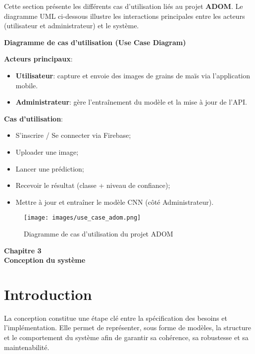 \documentclass[12pt,a4paper]{report}
\begin{document}
Cette section présente les différents cas d’utilisation liés au projet \textbf{ADOM}.
Le diagramme UML ci-dessous illustre les interactions principales entre les acteurs (utilisateur et administrateur) et le système.

\textbf{Diagramme de cas d’utilisation (Use Case Diagram)}

\textbf{Acteurs principaux}:
\begin{itemize}
    \item \textbf{Utilisateur}: capture et envoie des images de grains de maïs via l’application mobile.
    \item \textbf{Administrateur}: gère l’entraînement du modèle et la mise à jour de l’API.
\end{itemize}

\textbf{Cas d’utilisation}:
\begin{itemize}
    \item S’inscrire / Se connecter via Firebase;
    \item Uploader une image;
    \item Lancer une prédiction;
    \item Recevoir le résultat (classe + niveau de confiance);
    \item Mettre à jour et entraîner le modèle CNN (côté Administrateur).
\end{itemize}

\begin{figure}[H]
    \centering
    \texttt{[image: images/use\_case\_adom.png]} %
    \caption{Diagramme de cas d’utilisation du projet ADOM}
    \label{fig:usecase-adom}
\end{figure}

\cleardoublepage
\thispagestyle{empty}
\begin{center}
    \vspace*{4cm}
    {\Huge \textbf{Chapitre 3}}\\[1.5cm]
    {\LARGE \textbf{Conception du système}}
\end{center}
\cleardoublepage

\setcounter{section}{0}

\section{Introduction}
La conception constitue une étape clé entre la spécification des besoins et l’implémentation.
Elle permet de représenter, sous forme de modèles, la structure et le comportement du système
afin de garantir sa cohérence, sa robustesse et sa maintenabilité.
\end{document}
